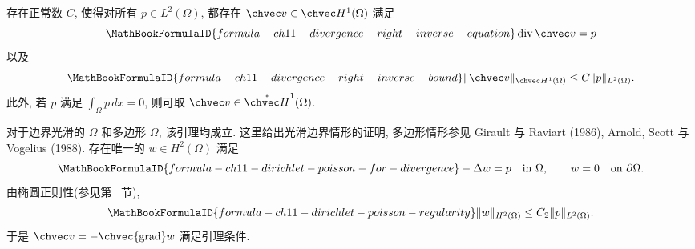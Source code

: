 \begin{Lemma}
\label{lem:ch11-divergence-right-inverse}
存在正常数 $C$, 使得对所有 $p\in L^2(\Omega)$, 都存在 $\chvec v\in\chvec H^1(\Omega)$ 满足
\[
\MathBookFormulaID{formula-ch11-divergence-right-inverse-equation}
\operatorname{div}\chvec v=p
\]
以及
\[
\MathBookFormulaID{formula-ch11-divergence-right-inverse-bound}
\|\chvec v\|_{\chvec H^1(\Omega)}\leq C\|p\|_{L^2(\Omega)}.
\]
此外, 若 $p$ 满足 $\int_\Omega p\,dx=0$, 则可取 $\chvec v\in\mathring{\chvec H}^1(\Omega)$.
\end{Lemma}

\begin{Proof}
对于边界光滑的 $\Omega$ 和多边形 $\Omega$, 该引理均成立. 这里给出光滑边界情形的证明, 多边形情形参见 Girault 与 Raviart (1986), Arnold, Scott 与 Vogelius (1988). 存在唯一的 $w\in H^2(\Omega)$ 满足
\[
\MathBookFormulaID{formula-ch11-dirichlet-poisson-for-divergence}
-\Delta w=p\quad\text{in }\Omega,
\qquad w=0\quad\text{on }\partial\Omega.
\]
由椭圆正则性(参见第~ 节),
\[
\MathBookFormulaID{formula-ch11-dirichlet-poisson-regularity}
\|w\|_{H^2(\Omega)}\leq C_2\|p\|_{L^2(\Omega)}.
\]
于是 $\chvec v=-\chvec{\operatorname{grad}}w$ 满足引理条件.


\end{Proof}
